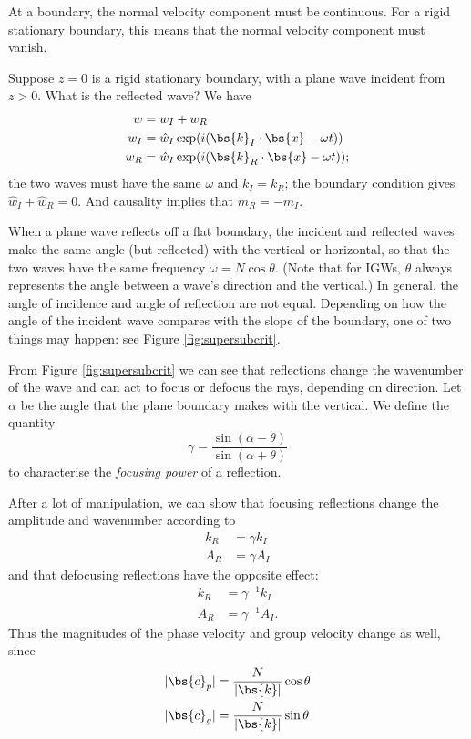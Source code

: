 At a boundary, the normal velocity component must be continuous. For a rigid stationary boundary, this means that the normal velocity component must vanish.

Suppose $z=0$ is a rigid stationary boundary, with a plane wave incident from $z>0$. What is the reflected wave? We have 
\begin{align}
	w &= w_I + w_R \\
	w_I &= \hat{w}_I \exp(i(\bs{k}_I\cdot\bs{x} - \omega t)) \\
	w_R &= \hat{w}_I \exp(i(\bs{k}_R\cdot\bs{x} - \omega t));
\end{align}
the two waves must have the same $\omega$ and $k_I = k_R$; the boundary condition gives $\hat{w}_I + \hat{w}_R = 0$. And causality implies that $m_R = -m_I$. 

When a plane wave reflects off a flat boundary, the incident and reflected waves
make the same angle (but reflected) with the vertical or horizontal, so that the
two waves have the same frequency $\omega = N\cos\theta$. (Note that for IGWs,
$\theta$ always represents the angle between a wave's direction and the
vertical.) In general, the angle of incidence and angle of reflection are not
equal. Depending on how the angle of the incident wave compares with the slope
of the boundary, one of two things may happen: see Figure
\ref{fig:supersubcrit}. 

From Figure \ref{fig:supersubcrit} we can see that reflections change the
wavenumber of the wave and can act to focus or defocus the rays, depending on
direction. Let $\alpha$ be the angle that the plane boundary makes with the
vertical. We define the quantity 
\begin{equation}
	\gamma  =  \frac{\sin(\alpha-\theta)}{\sin(\alpha+\theta)}
\end{equation}
to characterise the \textit{focusing power} of a reflection. 

After a lot of manipulation, we can show that focusing reflections change the amplitude and wavenumber according to
\begin{align}
	k_R  &= \gamma k_I \\
	A_R &= \gamma A_I 
\end{align}
and that defocusing reflections have the opposite effect:
\begin{align}
	k_R  &= \gamma^{-1} k_I \\
	A_R &= \gamma^{-1} A_I.
\end{align}
Thus the magnitudes of the phase velocity and group velocity change as well,
since
\begin{align}
    |\bs{c}_p| &= \frac{N}{|\bs{k}|} \cos\theta \\
    |\bs{c}_g| &= \frac{N}{|\bs{k}|} \sin\theta 
\end{align}

